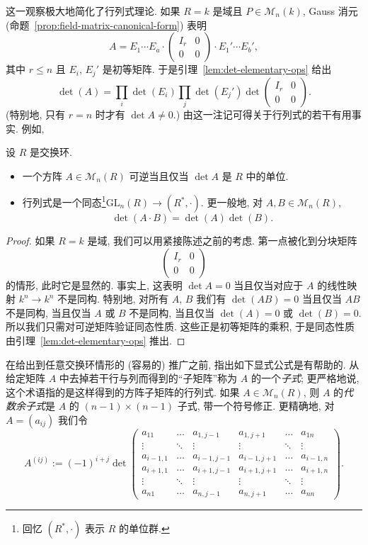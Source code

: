 这一观察极大地简化了行列式理论. 如果 $R=k$ 是域且 $P\in\mathcal{M}_n(k)$, Gauss 消元 (命题~\ref{prop:field-matrix-canonical-form}) 表明
\[
A=E_1\cdots E_a\cdot\begin{pmatrix} I_r&0\\ \hline 0&0\end{pmatrix}\cdot E_1'\cdots E_b',
\]
其中 $r\le n$ 且 $E_i$, $E_j'$ 是初等矩阵. 于是引理~\ref{lem:det-elementary-ops} 给出
\[
\det(A)=\prod_i\det(E_i)\prod_j\det(E_j')\det\begin{pmatrix} I_r&0\\ \hline 0&0\end{pmatrix}.
\]
(特别地, 只有 $r=n$ 时才有 $\det A\neq0$.) 由这一注记可得关于行列式的若干有用事实. 例如,

\begin{proposition}\label{prop:det-invertible-unit}
设 $R$ 是交换环.
\begin{itemize}
\item 一个方阵 $A\in\mathcal{M}_n(R)$ 可逆当且仅当 $\det A$ 是 $R$ 中的单位.
\item 行列式是一个同态\footnote{回忆 $(R^*,\cdot)$ 表示 $R$ 的单位群.}$\mathrm{GL}_n(R)\to(R^*,\cdot)$. 更一般地, 对 $A,B\in\mathcal{M}_n(R)$,
\[
\det(A\cdot B)=\det(A)\det(B).
\]
\end{itemize}
\end{proposition}

\begin{proof}
如果 $R=k$ 是域, 我们可以用紧接陈述之前的考虑. 第一点被化到分块矩阵
\[
\begin{pmatrix} I_r&0\\ \hline 0&0\end{pmatrix}
\]
的情形, 此时它是显然的. 事实上, 这表明 $\det A=0$ 当且仅当对应于 $A$ 的线性映射 $k^n\to k^n$ 不是同构. 特别地, 对所有 $A$, $B$ 我们有 $\det(AB)=0$ 当且仅当 $AB$ 不是同构, 当且仅当 $A$ 或 $B$ 不是同构, 当且仅当 $\det(A)=0$ 或 $\det(B)=0$. 所以我们只需对可逆矩阵验证同态性质. 这些正是初等矩阵的乘积, 于是同态性质由引理~\ref{lem:det-elementary-ops} 推出.
\end{proof}

在给出到任意交换环情形的 (容易的) 推广之前, 指出如下显式公式是有帮助的. 从给定矩阵 $A$ 中去掉若干行与列而得到的``子矩阵''称为 $A$ 的一个\emph{子式}; 更严格地说, 这个术语指的是这样得到的方阵子矩阵的行列式. 如果 $A\in\mathcal{M}_n(R)$, 则 $A$ 的\emph{代数余子式}是 $A$ 的 $(n-1)\times(n-1)$ 子式, 带一个符号修正. 更精确地, 对 $A=(a_{ij})$ 我们令
\[
A^{(ij)}:=(-1)^{i+j}\det\begin{pmatrix}
a_{11}&\dots&a_{1,j-1}&a_{1,j+1}&\dots&a_{1n}\\
\vdots&\ddots&\vdots&\vdots&\ddots&\vdots\\
a_{i-1,1}&\dots&a_{i-1,j-1}&a_{i-1,j+1}&\dots&a_{i-1,n}\\
a_{i+1,1}&\dots&a_{i+1,j-1}&a_{i+1,j+1}&\dots&a_{i+1,n}\\
\vdots&\ddots&\vdots&\vdots&\ddots&\vdots\\
a_{n1}&\dots&a_{n,j-1}&a_{n,j+1}&\dots&a_{nn}
\end{pmatrix}.
\]

